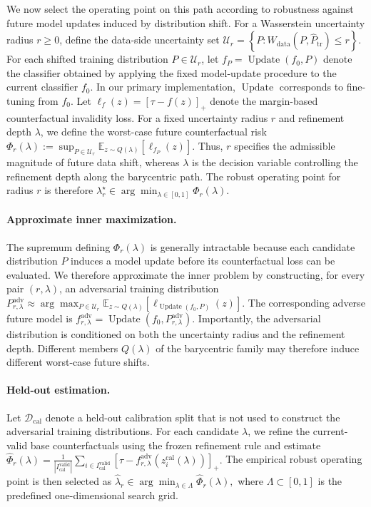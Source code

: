 We now select the operating point on this path according to robustness
against future model updates induced by distribution shift.
For a Wasserstein uncertainty radius $r\ge 0$, define the data-side
uncertainty set
$
\mathcal U_r
=
\left\{
P:
W_{\mathrm{data}}(P,\widehat P_{\mathrm{tr}})\le r
\right\}.
$
For each shifted training distribution $P\in\mathcal U_r$, let
$
f_P
=
\operatorname{Update}(f_0,P)
$
denote the classifier obtained by applying the fixed model-update
procedure to the current classifier $f_0$. In our primary implementation,
$\operatorname{Update}$ corresponds to fine-tuning from $f_0$.
Let
$
\ell_f(z)
=
[\tau-f(z)]_+
$
denote the margin-based counterfactual invalidity loss. For a fixed
uncertainty radius $r$ and refinement depth $\lambda$, we define the
worst-case future counterfactual risk
$
\Phi_r(\lambda)
:=
\sup_{P\in\mathcal U_r}
\mathbb E_{z\sim Q(\lambda)}
\left[
\ell_{f_P}(z)
\right].
$
Thus, $r$ specifies the admissible magnitude of future data shift,
whereas $\lambda$ is the decision variable controlling the refinement
depth along the barycentric path.
The robust operating point for radius $r$ is therefore
$
\lambda_r^\star
\in
\arg\min_{\lambda\in[0,1]}
\Phi_r(\lambda).
$

\paragraph{Approximate inner maximization.}
The supremum defining $\Phi_r(\lambda)$ is generally intractable because
each candidate distribution $P$ induces a model update before its
counterfactual loss can be evaluated. We therefore approximate the inner
problem by constructing, for every pair $(r,\lambda)$, an adversarial
training distribution
$
P_{r,\lambda}^{\mathrm{adv}}
\approx
\arg\max_{P\in\mathcal U_r}
\mathbb E_{z\sim Q(\lambda)}
\left[
\ell_{\operatorname{Update}(f_0,P)}(z)
\right].
$
The corresponding adverse future model is
$
f_{r,\lambda}^{\mathrm{adv}}
=
\operatorname{Update}
\left(
f_0,
P_{r,\lambda}^{\mathrm{adv}}
\right).
$
Importantly, the adversarial distribution is conditioned on both the
uncertainty radius and the refinement depth. Different members
$Q(\lambda)$ of the barycentric family may therefore induce different
worst-case future shifts.

\paragraph{Held-out estimation.}
Let $\mathcal D_{\mathrm{cal}}$ denote a held-out calibration split that
is not used to construct the adversarial training distributions. For
each candidate $\lambda$, we refine the current-valid base
counterfactuals using the frozen refinement rule and estimate
$
\widehat\Phi_r(\lambda)
=
\frac{1}{|I_{\mathrm{cal}}^{\mathrm{valid}}|}
\sum_{i\in I_{\mathrm{cal}}^{\mathrm{valid}}}
\left[
\tau-
f_{r,\lambda}^{\mathrm{adv}}
\left(
z_i^{\mathrm{cal}}(\lambda)
\right)
\right]_+ .
$
The empirical robust operating point is then selected as
$
\widehat\lambda_r
\in
\arg\min_{\lambda\in\Lambda}
\widehat\Phi_r(\lambda),
$
where $\Lambda\subset[0,1]$ is the predefined one-dimensional search
grid.


